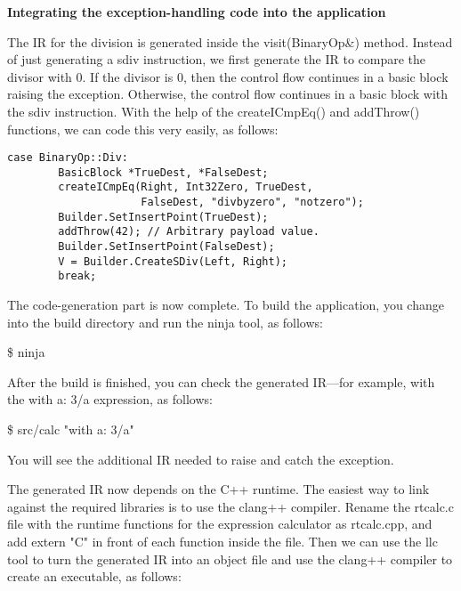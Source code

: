 \hspace*{\fill} \par %
\textbf{Integrating the exception-handling code into the application}

The IR for the division is generated inside the visit(BinaryOp\&) method. Instead of just generating a sdiv instruction, we first generate the IR to compare the divisor with 0. If the divisor is 0, then the control flow continues in a basic block raising the exception. Otherwise, the control flow continues in a basic block with the sdiv instruction. With the help of the createICmpEq() and addThrow() functions, we can code this very easily, as follows:\par

\begin{lstlisting}[caption={}]
	case BinaryOp::Div:
		BasicBlock *TrueDest, *FalseDest;
		createICmpEq(Right, Int32Zero, TrueDest,
					 FalseDest, "divbyzero", "notzero");
		Builder.SetInsertPoint(TrueDest);
		addThrow(42); // Arbitrary payload value.
		Builder.SetInsertPoint(FalseDest);
		V = Builder.CreateSDiv(Left, Right);
		break;
\end{lstlisting}

The code-generation part is now complete. To build the application, you change into the build directory and run the ninja tool, as follows:\par

\begin{tcolorbox}[colback=white,colframe=black]
\$ ninja
\end{tcolorbox}

After the build is finished, you can check the generated IR—for example, with the with a: 3/a expression, as follows:\par

\begin{tcolorbox}[colback=white,colframe=black]
\$ src/calc "with a: 3/a"
\end{tcolorbox}

You will see the additional IR needed to raise and catch the exception.\par

The generated IR now depends on the C++ runtime. The easiest way to link against the required libraries is to use the clang++ compiler. Rename the rtcalc.c file with the runtime functions for the expression calculator as rtcalc.cpp, and add extern "C" in front of each function inside the file. Then we can use the llc tool to turn the generated IR into an object file and use the clang++ compiler to create an executable, as follows:\par

